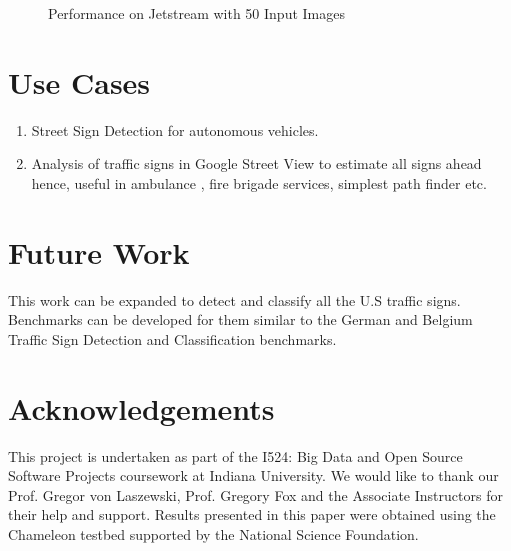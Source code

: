 \documentclass[9pt,twocolumn,twoside]{../../styles/osajnl}
\begin{document}
\begin{figure}[htbp]
\centering
{}
\caption{Performance on Jetstream with 50 Input Images}
\label{fig:jmedium50}
\end{figure}

\section{Use Cases}
\begin{enumerate}
\item Street Sign Detection for autonomous vehicles.
\item Analysis of traffic signs in Google Street View to estimate all
  signs ahead hence, useful in ambulance , fire brigade services,
  simplest path finder etc.
\end{enumerate}


\section{Future Work}
This work can be expanded to detect and classify all the U.S traffic
signs. Benchmarks can be developed for them similar to the German and
Belgium Traffic Sign Detection and Classification benchmarks.


\section*{Acknowledgements}
This project is undertaken as part of the I524: Big Data and Open
Source Software Projects coursework at Indiana University. We would
like to thank our Prof. Gregor von Laszewski, Prof. Gregory Fox and
the Associate Instructors for their help and support. Results
presented in this paper were obtained using the Chameleon testbed
supported by the National Science Foundation.
\end{document}
